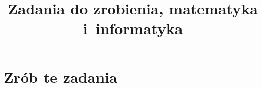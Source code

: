 \documentclass[a4paper,11pt]{article}
\title{Zadania do zrobienia, matematyka i~informatyka}
\begin{document}





\maketitle  %





\section{Zrób te zadania}


\end{document}
